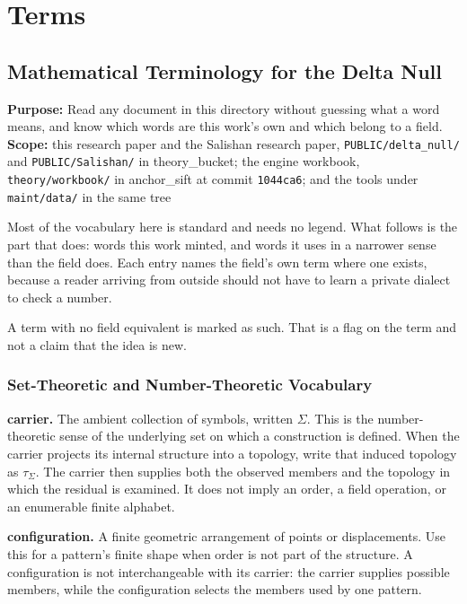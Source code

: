 \chapter{Terms}

\section{Mathematical Terminology for the Delta Null}

\textbf{Purpose:} Read any document in this directory without guessing what a word means, and know which words are this work's own and which belong to a field. \textbf{Scope:} this research paper and the Salishan research paper, \texttt{PUBLIC/\allowbreak{}delta\_\allowbreak{}null/\allowbreak{}} and \texttt{PUBLIC/\allowbreak{}Salishan/\allowbreak{}} in theory\_bucket; the engine workbook, \texttt{theory/\allowbreak{}workbook/\allowbreak{}} in anchor\_sift at commit \texttt{1044ca6}; and the tools under \texttt{maint/\allowbreak{}data/\allowbreak{}} in the same tree

Most of the vocabulary here is standard and needs no legend. What follows is the part that does: words this work minted, and words it uses in a narrower sense than the field does. Each entry names the field's own term where one exists, because a reader arriving from outside should not have to learn a private dialect to check a number.

A term with no field equivalent is marked as such. That is a flag on the term and not a claim that the idea is new.

\subsection{Set-Theoretic and Number-Theoretic Vocabulary}

\noindent\textbf{carrier.} The ambient collection of symbols, written \(\Sigma\). This is the number-theoretic sense of the underlying set on which a construction is defined. When the carrier projects its internal structure into a topology, write that induced topology as \(\tau_\Sigma\). The carrier then supplies both the observed members and the topology in which the residual is examined. It does not imply an order, a field operation, or an enumerable finite alphabet.

\noindent\textbf{configuration.} A finite geometric arrangement of points or displacements. Use this for a pattern's finite shape when order is not part of the structure. A configuration is not interchangeable with its carrier: the carrier supplies possible members, while the configuration selects the members used by one pattern.

